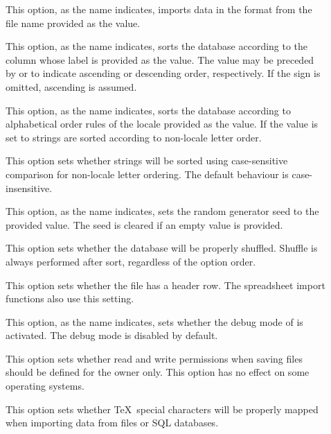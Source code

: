 \begin{description}
\begin{description}
\item[] This option, as the name indicates, imports data in the  format from the file name provided as the value.

\item[] This option, as the name indicates, sorts the database according to the column whose label is provided as the value. The value may be preceded by \rbox{+} or \rbox{-} to indicate ascending or descending order, respectively. If the sign is omitted, ascending is assumed.

\item[] This option, as the name indicates, sorts the database according to alphabetical order rules of the locale provided as the value. If the value is set to  strings are sorted according to non-locale letter order.

\item[] This option sets whether strings will be sorted using case-sensitive comparison for non-locale letter ordering. The default behaviour is case-insensitive.

\item[] This option, as the name indicates, sets the random generator seed to the provided value. The seed is cleared if an empty value is provided.

\item[] This option sets whether the database will be properly shuffled. Shuffle is always performed after sort, regardless of the option order.

\item[] This option sets whether the  file has a header row. The
spreadsheet import functions also use this setting.

\item[] This option, as the name indicates, sets whether the debug mode of  is activated. The debug mode is disabled by default.

\item[] This option sets whether read and write permissions when saving  files should be defined for the owner only. This option has no effect on some operating systems.

\item[] This option sets whether \TeX\ special characters will be properly mapped when importing data from  files or \gls{SQL} databases.


\end{description}
\end{description}
